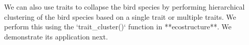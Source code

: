 \documentclass[12pt]{article}
\begin{document}
\begin{knitrout}
\color{fgcolor}\begin{kframe}
\begin{alltt}
\hlstd{(func_counts[,}\hlopt{:}\hlstd{])}
\end{alltt}
\end{kframe}
\end{knitrout}


We can also use traits to collapse the bird species by performing hierarchical clustering of the bird species based on a single trait or multiple traits. We perform this using the `trait_cluster()` function in **ecostructure**. We demonstrate its application next.
\end{document}
